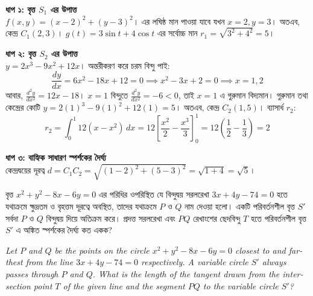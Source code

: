 \documentclass[12pt, a4paper]{article}
\begin{document}
\begin{tcolorbox}[solutionbox={সমাধান (Solution)}]
    \noindent
    \textbf{ধাপ ১: বৃত্ত $S_1$ এর উপাত্ত} \\
    $f(x, y) = (x-2)^2 + (y-3)^2$। এর লঘিষ্ঠ মান পাওয়া যাবে যখন $x=2, y=3$। অতএব, কেন্দ্র $C_1(2, 3)$। 
    $g(t) = 3\sin t + 4\cos t$ এর সর্বোচ্চ মান $r_1 = \sqrt{3^2 + 4^2} = 5$।
    
    \vspace{0.5em}
    \noindent\textbf{ধাপ ২: বৃত্ত $S_2$ এর উপাত্ত} \\
    $y = 2x^3 - 9x^2 + 12x$। অন্তরীকরণ করে চরম বিন্দু পাই:
    \[ \frac{dy}{dx} = 6x^2 - 18x + 12 = 0 \implies x^2 - 3x + 2 = 0 \implies x = 1, 2 \]
    আবার, $\frac{d^2y}{dx^2} = 12x - 18$। $x=1$ বিন্দুতে $\frac{d^2y}{dx^2} = -6 < 0$, তাই $x=1$ এ গুরুমান বিদ্যমান। 
    গুরুমান তথা কেন্দ্রের কোটি $y = 2(1)^3 - 9(1)^2 + 12(1) = 5$। অতএব, কেন্দ্র $C_2(1, 5)$। 
    ব্যাসার্ধ $r_2$:
    \[ r_2 = \int_0^1 12(x - x^2) \, dx = 12 \left[ \frac{x^2}{2} - \frac{x^3}{3} \right]_0^1 = 12 \left( \frac{1}{2} - \frac{1}{3} \right) = 2 \]
    
    \vspace{0.5em}
    \noindent\textbf{ধাপ ৩: বাহ্যিক সাধারণ স্পর্শকের দৈর্ঘ্য} \\
    কেন্দ্রদ্বয়ের দূরত্ব $d = C_1C_2 = \sqrt{(1-2)^2 + (5-3)^2} = \sqrt{1 + 4} = \sqrt{5}$। 
\end{tcolorbox}

\begin{tcolorbox}[questionbox={প্রশ্ন (Question) 39}]
    \noindent
    বৃত্ত $x^2 + y^2 - 8x - 6y = 0$ এর পরিধির ওপরিস্থিত যে বিন্দুদ্বয় সরলরেখা $3x + 4y - 74 = 0$ হতে যথাক্রমে ক্ষুদ্রতম ও বৃহত্তম দূরত্বে অবস্থিত, তাদের যথাক্রমে $P$ ও $Q$ নাম দেওয়া হলো। একটি পরিবর্তনশীল বৃত্ত $S'$ সর্বদা $P$ ও $Q$ বিন্দুদ্বয় দিয়ে অতিক্রম করে। প্রদত্ত সরলরেখা এবং $PQ$ রেখাংশের ছেদবিন্দু $T$ হতে পরিবর্তনশীল বৃত্ত $S'$ এ অঙ্কিত স্পর্শকের দৈর্ঘ্য কত একক?
    
    \vspace{0.8em}
    \begin{english}
    \noindent\textit{\color{darkgray}
    Let $P$ and $Q$ be the points on the circle $x^2 + y^2 - 8x - 6y = 0$ closest to and farthest from the line $3x + 4y - 74 = 0$ respectively. A variable circle $S'$ always passes through $P$ and $Q$. What is the length of the tangent drawn from the intersection point $T$ of the given line and the segment $PQ$ to the variable circle $S'$?
    }
    \end{english}
\end{tcolorbox}
\end{document}
